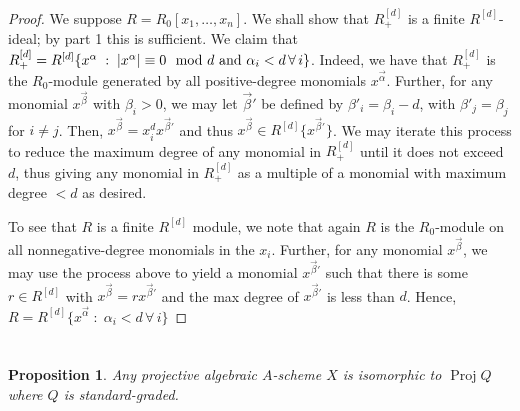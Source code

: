 \documentclass[english,letter,doublesided]{article}
\let\avec=\vec
\renewcommand\vec{\mathbf}
\DeclarePairedDelimiter\abs{\lvert}{\rvert}%
\newcommand{\prob}[1]{\setcounter{section}{#1-1}\section{}}
\newtheorem*{prop*}{Proposition}
\theoremstyle{remark}
\theoremstyle{definition}
\DeclareMathOperator{\proj}{Proj}
\begin{document}
	\begin{proof}
		We suppose $R=R_0[x_1,\dots,x_n]$. We shall show that $R^{[d]}_+$ is a finite $R^{[d]}$-ideal; by part 1 this is sufficient. We claim that $R^{[d]}_+=R^{[d]}\{x^{\avec{\alpha}}\;:\; \abs{x^{\avec{\alpha}}}\equiv 0 \mod d\text{ and }\alpha_i<d\,\forall\,i\}$. Indeed, we have that $R_+^{[d]}$ is the $R_0$-module generated by all positive-degree monomials $x^{\avec{\alpha}}$. Further, for any monomial $x^{\avec{\beta}}$ with $\beta_i>0$, we may let $\avec{\beta}'$ be defined by $\beta'_i=\beta_i-d$, with $\beta'_j=\beta_j$ for $i\neq j$. Then, $x^{\avec{\beta}}=x_i^dx^{\avec{\beta}'}$ and thus $x^{\avec{\beta}}\in R^{[d]}\{x^{\avec{\beta}'}\}$. We may iterate this process to reduce the maximum degree of any monomial in $R_+^{[d]}$ until it does not exceed $d$, thus giving any monomial in $R^{[d]}_+$ as a multiple of a monomial with maximum degree $<d$ as desired.
		
		To see that $R$ is a finite $R^{[d]}$ module, we note that again $R$ is the $R_0$-module on all nonnegative-degree monomials in the $x_i$. Further, for any monomial $x^{\avec{\beta}}$, we may use the process above to yield a monomial $x^{\avec{\beta}'}$ such that there is some $r\in R^{[d]}$ with $x^{\avec{\beta}}=rx^{\avec{\beta}'}$ and the max degree of $x^{\avec{\beta}'}$ is less than $d$. Hence, $R=R^{[d]}\{x^{\avec{\alpha}}\;:\; 
		\alpha_i<d\,\forall\,i\}$
	\end{proof}
	\prob{2}
	\begin{prop*}
		Any projective algebraic $A$-scheme $X$ is isomorphic to $\proj Q$ where $Q$ is standard-graded.
	\end{prop*}
\end{document}
